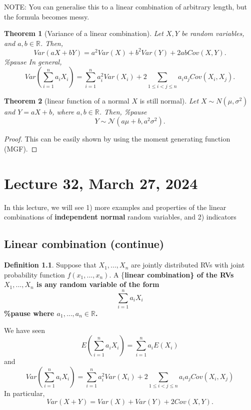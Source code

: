 \documentclass[
]{book}
\newtheorem{theorem}{Theorem}[chapter]
\theoremstyle{definition}
\newtheorem{definition}{Definition}[chapter]
\theoremstyle{definition}
\theoremstyle{definition}
\theoremstyle{definition}
\theoremstyle{remark}
\begin{document}
NOTE: You can generalise this to a linear combination of arbitrary length, but the formula becomes messy.

\begin{theorem}[Variance of a linear combination]
Let \(X,Y\) be random variables, and \(a,b \in \mathbb{R}\). Then,
\[
Var(aX + bY) = a^2 Var(X) + b^2 Var(Y) + 2ab Cov(X,Y).
\]
\%pause
In general,
\[
Var\left(\sum_{i=1}^n a_i X_i\right) 
= \sum_{i=1}^n a_i^2 Var(X_i) + 2\sum_{1\le i < j \le n} a_ia_j Cov(X_i,X_j).
\]
\end{theorem}

\begin{theorem}[linear function of a normal $X$ is still normal]
Let \(X \sim N(\mu, \sigma^2)\) and \(Y = aX + b\), where \(a,b \in \mathbb{R}\). Then,
\%pause
\[
Y \sim \mathcal{N}(a\mu + b, a^2 \sigma^2).
\]
\end{theorem}

\begin{proof}
This can be easily shown by using the moment generating function (MGF).
\end{proof}

\chapter{Lecture 32, March 27, 2024}\label{lecture-32-march-27-2024}

\newcommand{\var}{\mathbb{V}ar}
\newcommand{\R}{\mathbb{R}}
\newcommand{\E}{\mathbb{E}}
\newcommand{\N}{\mathcal{N}}

In this lecture, we will see 1) more examples and properties of the linear combinations of \textbf{independent normal} random variables, and 2) indicators

\section{Linear combination (continue)}\label{linear-combination-continue}

\begin{definition}
Suppose that \(X_1,...,X_n\) are jointly distributed RVs with joint probability function \(f(x_1,...,x_n)\). A \{\bf linear combination\} of the RVs \(X_1,...,X_n\) is any random variable of the form
\[
  \sum_{i=1}^{n} a_i X_i
  \]
\%pause
where \(a_1,...,a_n \in \mathbb{R}\).
\end{definition}

We have seen
\[ E\left(\sum_{i=1}^n a_i X_i\right)=\sum_{i=1}^n a_i E(X_i)\]
and
\[
        Var\left(\sum_{i=1}^n a_i X_i\right) 
        = \sum_{i=1}^n a_i^2 Var(X_i) + 2\sum_{1\le i < j \le n} a_ia_j Cov(X_i,X_j)
        \]
In particular,
\[ Var(X+Y) = Var(X) + Var(Y) + 2 Cov(X,Y).\]
\end{document}
